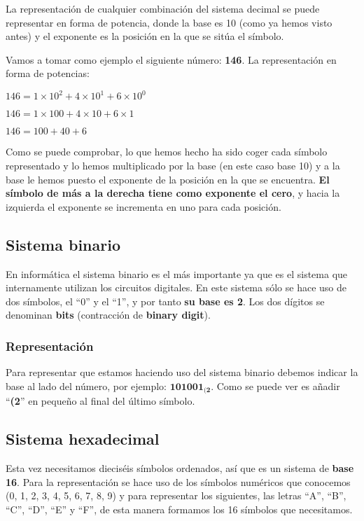 La representación de cualquier combinación del sistema decimal se puede representar en forma de potencia, donde la base es 10 (como ya hemos visto antes) y el exponente es la posición en la que se sitúa el símbolo.

Vamos a tomar como ejemplo el siguiente número: \textbf{146}. La representación en forma de potencias:

\begin{center}
    \vspace{-10pt}
    $ 146 =1\times10^2 + 4\times10^1 + 6\times10^0 $

    $ 146 = 1\times100 + 4\times10 + 6\times1 $

    $ 146 = 100+40+6 $
\end{center}

Como se puede comprobar, lo que hemos hecho ha sido coger cada símbolo representado y lo hemos multiplicado por la base (en este caso base 10) y a la base le hemos puesto el exponente de la posición en la que se encuentra. \textbf{El símbolo de más a la derecha tiene como exponente el cero}, y hacia la izquierda el exponente se incrementa en uno para cada posición.


\hypertarget{binario}{}
\subsection{Sistema binario}

En informática el sistema binario es el más importante ya que es el sistema que internamente utilizan los circuitos digitales. En este sistema sólo se hace uso de dos símbolos, el “0” y el “1”, y por tanto \textbf{su base es 2}. Los dos dígitos se denominan \textbf{bits} (contracción de \textbf{binary digit}).

\subsubsection*{Representación}

Para representar que estamos haciendo uso del sistema binario debemos indicar la base al lado del número, por ejemplo: $\mathbf{ 101001_{(2}} $. Como se puede ver es añadir “\textbf{(2}” en pequeño al final del último símbolo.


\subsection{Sistema hexadecimal}

Esta vez necesitamos dieciséis símbolos ordenados, así que es un sistema de \textbf{base 16}. Para la representación se hace uso de los símbolos numéricos que conocemos (0, 1, 2, 3, 4, 5, 6, 7, 8, 9) y para representar los siguientes, las letras “A”, “B”, “C”, “D”, “E” y “F”, de esta manera formamos los 16 símbolos que necesitamos.

